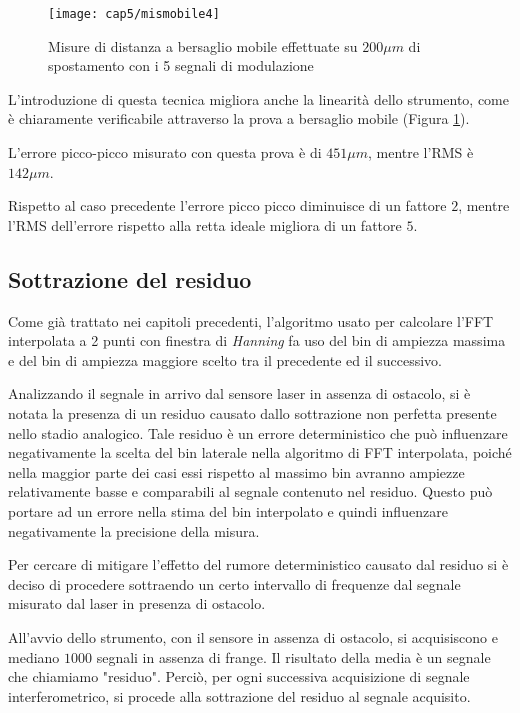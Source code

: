 \begin{figure}  
  \begin{center}
    \texttt{[image: cap5/mismobile4]}
    \caption{Misure di distanza a bersaglio mobile effettuate su $200\mu m$ di spostamento con i 5 segnali di modulazione}
    \label{mismobile4}
  \end{center}
\end{figure}

L'introduzione di questa tecnica migliora anche la linearità dello strumento, come è chiaramente verificabile attraverso la prova a bersaglio mobile (Figura \ref{mismobile4}).

L'errore picco-picco misurato con questa prova è di $451 \mu m$, mentre l'RMS è $142 \mu m$.

Rispetto al caso precedente l'errore picco picco diminuisce di un fattore $2$, mentre l'RMS dell'errore rispetto alla retta ideale migliora di un fattore $5$.

\subsection{Sottrazione del residuo}
Come già trattato nei capitoli precedenti, l'algoritmo usato per calcolare l'FFT interpolata a 2 punti con finestra di \textit{Hanning} fa uso del bin di ampiezza massima e del bin di ampiezza maggiore scelto tra il precedente ed il successivo.

Analizzando il segnale in arrivo dal sensore laser in assenza di ostacolo, si è notata la presenza di un residuo causato dallo sottrazione non perfetta presente nello stadio analogico. Tale residuo è un errore deterministico che può influenzare negativamente la scelta del bin laterale nella algoritmo di FFT interpolata, poiché nella maggior parte dei casi essi rispetto al massimo bin avranno ampiezze relativamente basse e comparabili al segnale contenuto nel residuo. Questo può portare ad un errore nella stima del bin interpolato e quindi influenzare negativamente la precisione della misura.

Per cercare di mitigare l'effetto del rumore deterministico causato dal residuo si è deciso di procedere sottraendo un certo intervallo di frequenze dal segnale misurato dal laser in presenza di ostacolo.

All'avvio dello strumento, con il sensore in assenza di ostacolo, si acquisiscono e mediano $1000$ segnali in assenza di frange. Il risultato della media è un segnale che chiamiamo "residuo". Perciò, per ogni successiva acquisizione di segnale interferometrico, si procede alla sottrazione del residuo al segnale acquisito.


